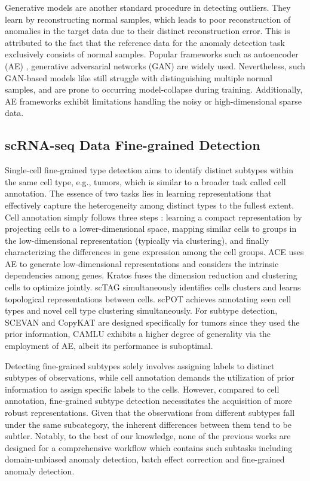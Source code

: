 \documentclass{article}
\begin{document}
Generative models are another standard procedure in detecting outliers. They learn by 
reconstructing normal samples, which leads to poor reconstruction of anomalies in 
the target data due to their distinct reconstruction error. This is attributed to the 
fact that the reference data for the anomaly detection task exclusively consists of 
normal samples.
Popular frameworks such as autoencoder (AE) \cite{odae}, generative adversarial 
networks (GAN) \cite{GANad} are widely used. Nevertheless, such GAN-based 
models like \cite{EffGAN} still struggle with distinguishing multiple normal samples, and are prone to 
occurring model-collapse during training. Additionally, AE frameworks exhibit limitations 
handling the noisy or high-dimensional sparse data.

\subsection{scRNA-seq Data Fine-grained Detection}
Single-cell fine-grained type detection aims to identify distinct subtypes within the same cell type, e.g., 
tumors, which is similar to a broader task called cell annotation. The essence of two 
tasks lies in learning representations that effectively capture the heterogeneity among 
distinct types to the fullest extent. Cell annotation simply follows three 
steps \cite{threestep}: learning a compact representation by projecting cells to a 
lower-dimensional space, mapping similar cells to groups in the low-dimensional 
representation (typically via clustering), and finally characterizing the differences in 
gene expression among the cell groups. ACE \cite{ACE} uses AE to generate 
low-dimensional representations and considers the intrinsic dependencies among genes. 
Kratos \cite{kratos} fuses the dimension reduction and clustering cells to 
optimize jointly. scTAG \cite{scTAG} simultaneously identifies cells clusters and 
learns topological representations between cells. scPOT \cite{scPOT} achieves 
annotating seen cell types and novel cell type clustering simultaneously. For subtype 
detection, SCEVAN \cite{SCEVAN} and CopyKAT \cite{CopyKAT} are designed 
specifically for tumors since they used the prior information, CAMLU \cite{CAMLU} 
exhibits a higher degree of generality via the employment of AE, albeit its performance is suboptimal. 

Detecting fine-grained subtypes solely involves assigning labels to distinct subtypes of observations, 
while cell annotation demands the utilization of prior information to assign specific 
labels to the cells. However, compared to cell annotation, fine-grained subtype detection necessitates 
the acquisition of more robust representations. Given that the observations from different 
subtypes fall under the same subcategory, the inherent differences between them tend to 
be subtler. Notably, to the best of our knowledge, none of the previous works are designed for a 
comprehensive workflow which contains such subtasks including domain-unbiased anomaly detection, 
batch effect correction and fine-grained anomaly detection.
\end{document}
